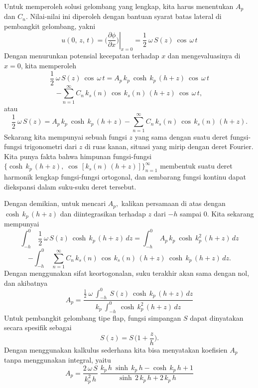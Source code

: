 \documentclass[12pt,a4paper]{report}
\begin{document}
Untuk memperoleh solusi gelombang yang lengkap, kita harus menentukan $A_{p}$
dan $C_{n}$. Nilai-nilai ini diperoleh dengan bantuan syarat batas lateral
di pembangkit gelombang, yakni
\begin{equation}
u(0,\,z,\,t)=\left.\Bigg(\frac{\partial \phi}{\partial x}\Bigg)\right|_{x=0}
= \frac{1}{2}\:\omega\,S(z)\:\cos\,\omega\,t
\end{equation}
Dengan menurunkan potensial kecepatan terhadap $x$ dan mengevaluasinya di $%
x=0$, kita memperoleh
\[
\frac{1}{2}\:\omega\,S(z)\:\cos\,\omega\,t =
A_{p}\,k_{p}\:\cosh\,k_{p}\,(h+z)\:\cos\,\omega\,t
\]
\begin{equation}
-\mathop {\sum}_{n=1}^{\infty} C_{n}\,k_{s}(n)\:\cos\,
k_{s}(n)\,(h+z)\:\cos\, \omega \,t,
\end{equation}
atau
\begin{equation}
\frac{1}{2}\:\omega\,S(z) = A_{p}\,k_{p}\:\cosh\,k_{p}\,(h+z)-\mathop {\sum}%
_{n=1}^{\infty} C_{n}\,k_{s}(n)\:\cos\, k_{s}(n)\,(h+z).  \label{fourier}
\end{equation}
Sekarang kita mempunyai sebuah fungsi $z$ yang sama dengan suatu deret
fungsi-fungsi trigonometri dari $z$ di ruas kanan, situasi yang mirip dengan
deret Fourier. Kita punya fakta bahwa himpunan fungsi-fungsi $\displaystyle%
\bigg\{\cosh\,k_{p}\,(h+z),\; \cos\, [k_{s}(n)\,(h+z)]\bigg\}_{n=1}^{\infty}$
membentuk suatu deret harmonik lengkap fungsi-fungsi ortogonal, dan
sembarang fungsi kontinu dapat diekspansi dalam suku-suku deret tersebut.

Dengan demikian, untuk mencari $A_{p},$ kalikan persamaan di atas dengan $%
\cosh\,k_{p}\,(h+z)$ dan diintegrasikan terhadap $z$ dari $-h$ sampai $0$.
Kita sekarang mempunyai
\[
\mathop {\int}_{-h}^{0}\: \frac{1}{2}\:\omega\,S(z)\:\cosh\,k_{p}\,(h+z)%
\,dz= \mathop {\int}_{-h}^{0}\:A_{p}\,k_{p}\:\cosh\,k_{p}^2\,(h+z)\,dz
\]
\begin{equation}
-\mathop {\int}_{-h}^{0}\; \mathop {\sum}_{n=1}^{\infty}
C_{n}\,k_{s}(n)\:\cos\,k_{s}(n)\,(h+z)\:\cosh\,k_{p}\,(h+z)\,dz.
\end{equation}
Dengan menggunakan sifat keortogonalan, suku terakhir akan sama dengan nol,
dan akibatnya
\begin{equation}
A_{p}=\frac{\frac{1}{2}\:\omega\:\int_{-h}^{0}\:S(z)\:\cosh\,k_{p}\,(h+z)\,dz%
} {k_{p}\:\mathop {\int}_{-h}^{0}\:\cosh\,k_{p}^2\,(h+z)\,dz}
\end{equation}
Untuk pembangkit gelombang tipe flap, fungsi simpangan $S$ dapat
dinyatakan secara spesifik sebagai
\begin{equation}
S(z)=S\,\Bigg(1+\frac{z}{h}\Bigg).
\end{equation}
Dengan menggunakan kalkulus sederhana kita bisa menyatakan koefisien $A_{p}$
tanpa menggunakan integral, yaitu
\begin{equation}
A_{p}=\frac{2\,\omega\,S}{k_{p}^2\,h}\;\frac{k_{p}\,h\:\sinh\,k_{p}\,h
-\cosh\,k_{p}\,h+1}{\sinh\,2\,k_{p}\,h+2\,k_{p}\,h}  \label{firstconst}
\end{equation}
\end{document}
